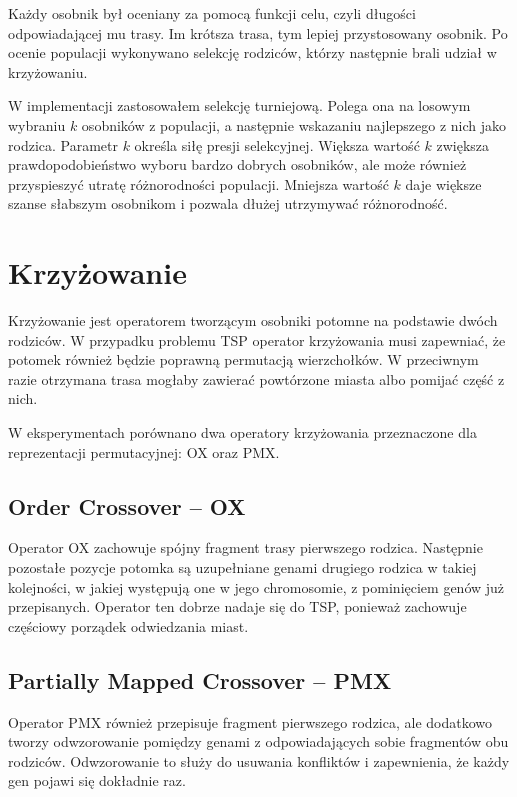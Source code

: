 \documentclass[12pt,a4paper]{article}
\begin{document}
Każdy osobnik był oceniany za pomocą funkcji celu, czyli długości odpowiadającej mu trasy. Im krótsza trasa, tym lepiej przystosowany osobnik. Po ocenie populacji wykonywano selekcję rodziców, którzy następnie brali udział w krzyżowaniu.

W implementacji zastosowałem selekcję turniejową. Polega ona na losowym wybraniu $k$ osobników z populacji, a następnie wskazaniu najlepszego z nich jako rodzica. Parametr $k$ określa siłę presji selekcyjnej. Większa wartość $k$ zwiększa prawdopodobieństwo wyboru bardzo dobrych osobników, ale może również przyspieszyć utratę różnorodności populacji. Mniejsza wartość $k$ daje większe szanse słabszym osobnikom i pozwala dłużej utrzymywać różnorodność.

\section{Krzyżowanie}

Krzyżowanie jest operatorem tworzącym osobniki potomne na podstawie dwóch rodziców. W przypadku problemu TSP operator krzyżowania musi zapewniać, że potomek również będzie poprawną permutacją wierzchołków. W przeciwnym razie otrzymana trasa mogłaby zawierać powtórzone miasta albo pomijać część z nich.

W eksperymentach porównano dwa operatory krzyżowania przeznaczone dla reprezentacji permutacyjnej: OX oraz PMX.

\subsection{Order Crossover -- OX}

Operator OX zachowuje spójny fragment trasy pierwszego rodzica. Następnie pozostałe pozycje potomka są uzupełniane genami drugiego rodzica w takiej kolejności, w jakiej występują one w jego chromosomie, z pominięciem genów już przepisanych. Operator ten dobrze nadaje się do TSP, ponieważ zachowuje częściowy porządek odwiedzania miast.

\subsection{Partially Mapped Crossover -- PMX}

Operator PMX również przepisuje fragment pierwszego rodzica, ale dodatkowo tworzy odwzorowanie pomiędzy genami z odpowiadających sobie fragmentów obu rodziców. Odwzorowanie to służy do usuwania konfliktów i zapewnienia, że każdy gen pojawi się dokładnie raz.
\end{document}
